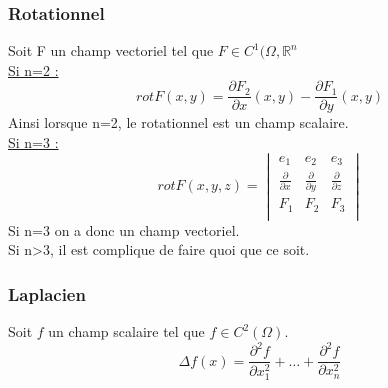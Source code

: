 \documentclass[../main.tex]{subfiles}
\begin{document}
\subsubsection{Rotationnel}
Soit F un champ vectoriel tel que $F\in C^1(\Omega, \mathbb{R}^n$\\

\quad \underline{Si n=2 :} \\
\begin{equation}
    rot F(x,y) = \frac{\partial F_2}{\partial x}(x,y) - \frac{\partial F_1}{\partial y}(x,y)
\end{equation}
Ainsi lorsque n=2, le rotationnel est un champ scalaire.\\

\quad \underline{Si n=3 :}\\
\begin{equation}
    rot F(x,y,z) = \begin{vmatrix}
        e_1 & e_2 & e_3\\
        \frac{\partial}{\partial x} & \frac{\partial}{\partial y} & \frac{\partial}{\partial z}\\
        F_1 & F_2 & F_3\\
    \end{vmatrix}
\end{equation}
Si n=3 on a donc un champ vectoriel.\\
Si n>3, il est complique de faire quoi que ce soit.\\

\subsubsection{Laplacien}
Soit $f$ un champ scalaire tel que $f\in C^2(\Omega)$.\\
\begin{equation}
    \Delta f(x) = \frac{\partial^2 f}{\partial x_1^2} + \dots + \frac{\partial^2 f}{\partial x_n^2}
\end{equation}
\end{document}
